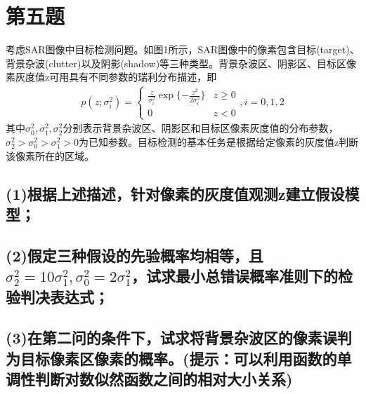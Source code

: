 \documentclass[fontset=windows]{article}
\numberwithin{figure}{section}
\begin{document}
\section{第五题}
考虑SAR图像中目标检测问题。如图1所示，SAR图像中的像素包含目标(target)、背景杂波(clutter)以及阴影(shadow)等三种类型。背景杂波区、阴影区、目标区像素灰度值z可用具有不同参数的瑞利分布描述，即
\begin{align*}
	p(z;\sigma^2_i)=\left\{
	\begin{matrix}
		\frac{z}{\sigma^2_i}\exp\{-\frac{z^2}{2\sigma^2_i}\} & z\geq0 \\
		0                                                    & z<0
	\end{matrix},i=0,1,2
	\right.
\end{align*}
其中\(\sigma^2_0,\sigma^2_1,\sigma^2_2\)分别表示背景杂波区、阴影区和目标区像素灰度值的分布参数，\(\sigma^2_2>\sigma^2_0>\sigma^2_1>0\)为已知参数。目标检测的基本任务是根据给定像素的灰度值z判断该像素所在的区域。

\subsection*{(1)根据上述描述，针对像素的灰度值观测z建立假设模型；}

\subsection*{(2)假定三种假设的先验概率均相等，且\(\sigma^2_2=10\sigma^2_1,\sigma^2_0=2\sigma^2_1\)，试求最小总错误概率准则下的检验判决表达式；}

\subsection*{(3)在第二问的条件下，试求将背景杂波区的像素误判为目标像素区像素的概率。(提示：可以利用函数的单调性判断对数似然函数之间的相对大小关系)}



\end{document}
